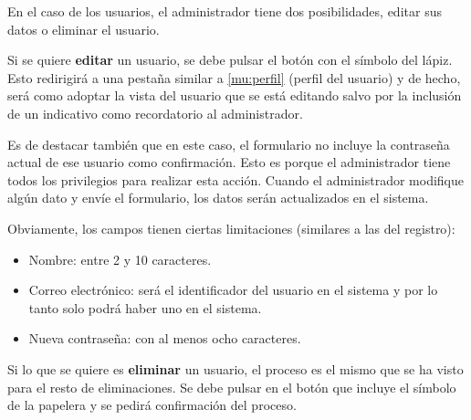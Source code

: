 En el caso de los usuarios, el administrador tiene dos posibilidades, editar sus
datos o eliminar el usuario.

Si se quiere \textbf{editar} un usuario, se debe pulsar el botón con el símbolo
del lápiz. Esto redirigirá a una pestaña similar a \ref{mu:perfil} (perfil del
usuario) y de hecho, será como adoptar la vista del usuario que se está editando
salvo por la inclusión de un indicativo como recordatorio al administrador.


Es de destacar también que en este caso, el formulario no incluye la contraseña
actual de ese usuario como confirmación. Esto es porque el administrador tiene
todos los privilegios para realizar esta acción. Cuando el administrador
modifique algún dato y envíe el formulario, los datos serán actualizados en el
sistema. 

Obviamente, los campos tienen ciertas limitaciones (similares a las del
registro):
\begin{itemize}
    \item Nombre: entre 2 y 10 caracteres.
    \item Correo electrónico: será el identificador del usuario en el sistema y
    por lo tanto solo podrá haber uno en el sistema.
    \item Nueva contraseña: con al menos ocho caracteres.
\end{itemize}

Si lo que se quiere es \textbf{eliminar} un usuario, el proceso es el mismo que
se ha visto para el resto de eliminaciones. Se debe pulsar en el botón que
incluye el símbolo de la papelera y se pedirá confirmación del proceso.

